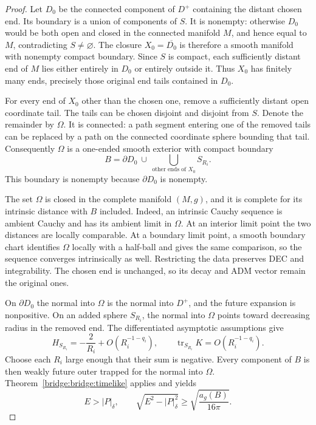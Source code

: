\begin{proof}
Let $D_0$ be the connected component of $D^+$ containing the distant
chosen end. Its boundary is a union of components of $S$. It is
nonempty: otherwise $D_0$ would be both open and closed in the connected
manifold $M$, and hence equal to $M$, contradicting $S\ne\varnothing$.
The closure $X_0=\overline{D_0}$ is therefore a smooth manifold with
nonempty compact boundary. Since $S$ is compact, each sufficiently
distant end of $M$ lies either entirely in $D_0$ or entirely outside
it. Thus $X_0$ has finitely many ends, precisely those original end
tails contained in $D_0$.

For every end of $X_0$ other than the chosen one, remove a sufficiently
distant open coordinate tail. The tails can be chosen disjoint and
disjoint from $S$. Denote the remainder by $\Omega$. It is connected: a
path segment entering one of the removed tails can be replaced by
a path on the connected coordinate sphere bounding that tail.
Consequently $\Omega$ is a one-ended smooth exterior with compact boundary
\[
             B=\partial D_0\ \cup\
               \bigcup_{\text{other ends of }X_0} S_{R_i}.
\]
This boundary is nonempty because $\partial D_0$ is nonempty.

The set $\Omega$ is closed in the complete manifold $(M,g)$, and it is
complete for its intrinsic distance with $B$ included. Indeed, an
intrinsic Cauchy sequence is ambient Cauchy and has its ambient limit
in $\Omega$. At an interior limit point the two distances are locally
comparable. At a boundary limit point, a smooth boundary chart
identifies $\Omega$ locally with a half-ball and gives the same comparison,
so the sequence converges intrinsically as well. Restricting the data
preserves DEC and integrability. The chosen end is unchanged, so its
decay and ADM vector remain the original ones.

On $\partial D_0$ the normal into $\Omega$ is the normal into $D^+$, and
the future expansion is nonpositive. On an added sphere $S_{R_i}$,
the normal into $\Omega$ points toward decreasing radius in the removed
end. The differentiated asymptotic assumptions give
\[
 H_{S_{R_i}}=-\frac{2}{R_i}+O(R_i^{-1-q_i}),\qquad
 \operatorname{tr}_{S_{R_i}}K=O(R_i^{-1-q_i}).
\]
Choose each $R_i$ large enough that their sum is negative. Every
component of $B$ is then weakly future outer trapped for the normal
into $\Omega$. Theorem~\ref{bridge:bridge:timelike} applies and yields
\begin{equation}
\label{bridge:bridge:restricted-inequality}
 E>|P|_\delta,\qquad
 \sqrt{E^2-|P|_\delta^2}\ge\sqrt{\frac{a_g(B)}{16\pi}}.
\end{equation}


\end{proof}
